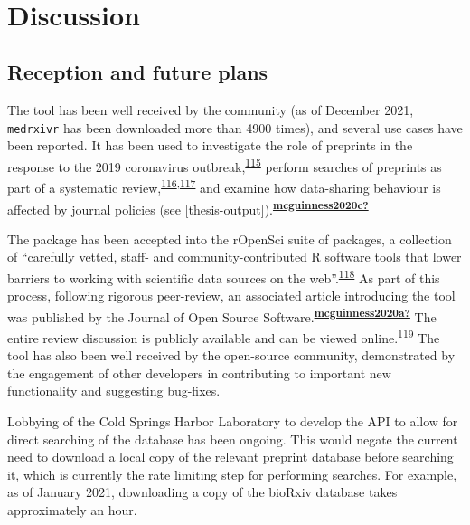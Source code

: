 \documentclass[a4paper, twoside]{templates/ociamthesis}
\begin{document}
~

\hypertarget{discussion}{%
\section{Discussion}\label{discussion}}

\hypertarget{reception-and-future-plans}{%
\subsection{Reception and future plans}\label{reception-and-future-plans}}

The tool has been well received by the community (as of December 2021, \texttt{medrxivr} has been downloaded more than 4900 times), and several use cases have been reported. It has been used to investigate the role of preprints in the response to the 2019 coronavirus outbreak,\textsuperscript{\protect\hyperlink{ref-kodvanj2020}{115}} perform searches of preprints as part of a systematic review,\textsuperscript{\protect\hyperlink{ref-noone2020}{116},\protect\hyperlink{ref-grassly2020}{117}} and examine how data-sharing behaviour is affected by journal policies (see \ref{thesis-output}).\textsuperscript{\protect\hyperlink{ref-mcguinness2020c}{\textbf{mcguinness2020c?}}}

The package has been accepted into the rOpenSci suite of packages, a collection of ``carefully vetted, staff- and community-contributed R software tools that lower barriers to working with scientific data sources on the web''.\textsuperscript{\protect\hyperlink{ref-boettiger2015}{118}} As part of this process, following rigorous peer-review, an associated article introducing the tool was published by the Journal of Open Source Software.\textsuperscript{\protect\hyperlink{ref-mcguinness2020a}{\textbf{mcguinness2020a?}}} The entire review discussion is publicly available and can be viewed online.\textsuperscript{\protect\hyperlink{ref-zotero-15016}{119}} The tool has also been well received by the open-source community, demonstrated by the engagement of other developers in contributing to important new functionality and suggesting bug-fixes.

Lobbying of the Cold Springs Harbor Laboratory to develop the API to allow for direct searching of the database has been ongoing. This would negate the current need to download a local copy of the relevant preprint database before searching it, which is currently the rate limiting step for performing searches. For example, as of January 2021, downloading a copy of the bioRxiv database takes approximately an hour.
\end{document}
